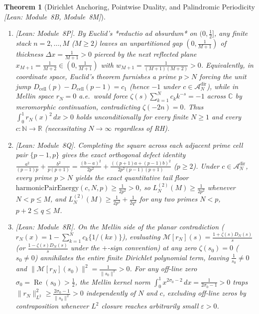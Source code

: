 \documentclass[10pt,a4paper]{article}
\newtheorem{theorem}{Theorem}[section]
\theoremstyle{definition}
\begin{document}
\begin{theorem}[Dirichlet Anchoring, Pointwise Duality, and Palindromic Periodicity \emph{[Lean: Module~8B, Module~8M]}]
\begin{enumerate}[leftmargin=1.8em,itemsep=2pt]
\item \emph{[Lean: Module~8P].} By Euclid's *reductio ad absurdum* on $(0, \tfrac{1}{2}]$, any finite stack $n = 2,\dots,M$ ($M \ge 2$) leaves an unpartitioned gap $(0, \tfrac{1}{M+1})$ of thickness $\Delta x = \tfrac{1}{M+1} > 0$ pierced by the next reflected plane $x_{M+1} = \tfrac{1}{M+2} \in (0, \tfrac{1}{M+1})$ with $w_{M+1} = \tfrac{1}{(M+1)(M+2)} > 0$. Equivalently, in coordinate space, Euclid's theorem furnishes a prime $p > N$ forcing the unit jump $D_{\mathrm{cell}}(p) - D_{\mathrm{cell}}(p-1) = c_1$ (hence $-1$ under $c \in \mathcal{A}_N^{\mathrm{dir}}$), while in Mellin space $r_N = 0$ a.e.\ would force $\zeta(s)\sum_{k=1}^N c_k k^{-s} = -1$ across $\mathbb{C}$ by meromorphic continuation, contradicting $\zeta(-2n) = 0$. Thus $\int_0^1 r_N(x)^2\,dx > 0$ holds unconditionally for every finite $N \ge 1$ and every $c : \mathbb{N} \to \mathbb{R}$ (necessitating $N \to \infty$ regardless of RH).
\item \emph{[Lean: Module~8Q].} Completing the square across each adjacent prime cell pair $\{p-1, p\}$ gives the exact orthogonal defect identity $\frac{a^2}{(p-1)p} + \frac{b^2}{p(p+1)} = \frac{(b-a)^2}{2p^2} + \frac{((p+1)a+(p-1)b)^2}{2p^2(p-1)(p+1)}$ ($p \ge 2$). Under $c \in \mathcal{A}_N^{\mathrm{dir}}$, every prime $p > N$ yields the exact quantitative tail floor $\mathrm{harmonicPairEnergy}(c,N,p) \ge \frac{1}{2p^2} > 0$, so $L_N^{(2)}(M) \ge \frac{1}{2p^2}$ whenever $N < p \le M$, and $L_N^{(2)}(M) \ge \frac{1}{2p^2} + \frac{1}{2q^2}$ for any two primes $N < p$, $p + 2 \le q \le M$.
\item \emph{[Lean: Module~8R].} On the Mellin side of the planar contradiction ($r_N(x) = 1 - \sum_{k=1}^N c_k \{1/(kx)\}$), evaluating $\mathcal{M}[r_N](s) = \frac{1 + \zeta(s)D_N(s)}{s}$ (or $\frac{1 - \zeta(s)D_N(s)}{s}$ under the $+$-sign convention) at any zero $\zeta(s_0) = 0$ ($s_0 \neq 0$) annihilates the entire finite Dirichlet polynomial term, leaving $\frac{1}{s_0} \neq 0$ and $\|\mathcal{M}[r_N](s_0)\|^2 = \frac{1}{\|s_0\|^2} > 0$. For any off-line zero $\sigma_0 = \operatorname{Re}(s_0) > \tfrac{1}{2}$, the Mellin kernel norm $\int_0^1 x^{2\sigma_0 - 2}\,dx = \frac{1}{2\sigma_0 - 1} > 0$ traps $\|r_N\|_{L^2}^2 \ge \frac{2\sigma_0 - 1}{\|s_0\|^2} > 0$ independently of $N$ and $c$, excluding off-line zeros by contraposition whenever $L^2$ closure reaches arbitrarily small $\varepsilon > 0$.

\end{enumerate}
\end{theorem}
\end{document}
